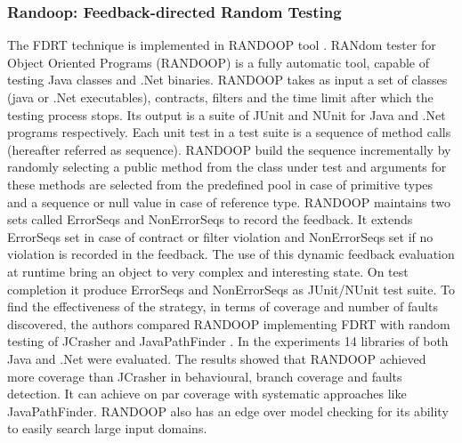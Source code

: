 \subsubsection{Randoop: Feedback-directed Random Testing}
The FDRT technique is implemented in RANDOOP tool \cite{Pacheco2007b}. RANdom tester for Object Oriented Programs (RANDOOP) is a fully automatic tool, capable of testing Java classes and .Net binaries. RANDOOP takes as input a set of classes (java or .Net executables), contracts, filters and the time limit after which the testing process stops. Its output is a suite of JUnit and NUnit for Java and .Net programs respectively. Each unit test in a test suite is a sequence of method calls (hereafter referred as sequence). RANDOOP build the sequence incrementally by randomly selecting a public method from the class under test and arguments for these methods are selected from the predefined pool in case of primitive types and a sequence or null value in case of reference type. RANDOOP maintains two sets called ErrorSeqs and NonErrorSeqs to record the feedback. It extends ErrorSeqs set in case of contract or filter violation and NonErrorSeqs set if no violation is recorded in the feedback. The use of this dynamic feedback evaluation at runtime bring an object to very complex and interesting state. On test completion it produce ErrorSeqs and NonErrorSeqs as JUnit/NUnit test suite. To find the effectiveness of the strategy, in terms of coverage and number of faults discovered, the authors compared RANDOOP implementing FDRT with random testing of JCrasher and JavaPathFinder \cite{visser2004test}. In the experiments 14 libraries of both Java and .Net were evaluated.  The results showed that RANDOOP achieved more coverage than JCrasher in behavioural, branch coverage and faults detection. It can achieve on par coverage with systematic approaches like JavaPathFinder. RANDOOP also has an edge over model checking for its ability to easily search large input domains.



